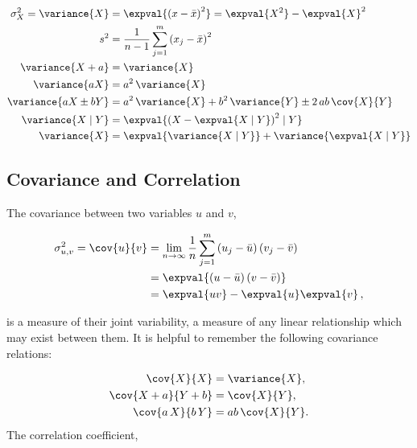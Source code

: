\begin{subequations}\label{eq:stats:var_relations}
\begin{align}
\sigma_{X}^{2} = \variance{X} &= \expval{\left(x-\bar{x}\right)^{2}} = \expval{X^{2}} - \expval{X}^{2} \label{eq:stats:var_relations:def} \\
s^{2} &= \frac{1}{n-1} \sum_{j=1}^{m} \left( x_{j} - \bar{x}\right)^{2} \label{eq:stats:var_relations:sample} \\
\variance{X+a} &= \variance{X} \label{eq:stats:var_relations:add} \\
\variance{a X} &= a^{2} \, \variance{X} \label{eq:stats:var_relations:mult} \\
\variance{a X \pm b Y} &= a^{2} \, \variance{X} + b^{2} \, \variance{Y} \pm 2 \, ab \, \cov{X}{Y} \label{eq:stats:var_relations:linear} \\
\variance{X \mid Y} &= \expval{\left(X - \expval{X \mid Y}\right)^{2} \mid Y} \label{eq:stats:var_relations:conditional1} \\
\variance{X} &= \expval{\variance{X \mid Y}} + \variance{\expval{X \mid Y}} \label{eq:stats:var_relations:conditional2}
\end{align}
\end{subequations}

\subsection{Covariance and Correlation}
\label{additional:stats:corr_covar}

The covariance between two variables $u$ and $v$,

\begin{equation}\label{eq:stats:covar}
\begin{split}
\sigma_{u,v}^{2} = \cov{u}{v} &= \lim_{n\to\infty}\frac{1}{n}\sum_{j=1}^{m}\left(u_{j}-\bar{u}\right)\left(v_{j}-\bar{v}\right) \\
&= \expval{\left(u-\bar{u}\right)\left(v-\bar{v}\right)} \\
&= \expval{u v} - \expval{u}\expval{v}\,,
\end{split}
\end{equation}

\noindent is a measure of their joint variability,
\ie a measure of any linear relationship which may exist between them.
It is helpful to remember the following covariance relations:

\begin{subequations}\label{eq:stats:covar_relations}
\begin{align}
\cov{X}{X} &= \variance{X}, \label{eq:stats:covar_relations:var} \\
\cov{X + a}{Y + b} &= \cov{X}{Y}, \label{eq:stats:covar_relations:add} \\
\cov{a\,X}{b\,Y} &= ab\,\cov{X}{Y}. \label{eq:stats:covar_relations:mult}
\end{align}
\end{subequations}
The correlation coefficient,

